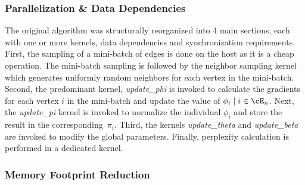 \subsubsection{Parallelization \& Data Dependencies}
The original algorithm was structurally reorganized into 4 main sections, each with
one or more kernels, data dependencies and synchronization requirements.
%
First, the sampling of a mini-batch of edges is done on the host as it is a
cheap operation. The mini-batch sampling is followed by the neighbor sampling
kernel which generates uniformly random neighbors for each vertex in the
mini-batch. 
%
Second, the predominant kernel, \textit{update\_phi} is invoked to calculate the
gradients for each vertex $i$ in the mini-batch \Minibatch and update the value of $\phi_i
\mid i \in \Minibatch$. Next, the \textit{update\_pi} kernel is invoked to normalize the
individual $\phi_i$ and store the result in the corresponding~$\pi_i$.
%
Third, the kernels \textit{update\_theta} and \textit{update\_beta} are invoked to modify the
global parameters.
%
Finally, perplexity calculation is performed in a dedicated kernel.

\subsubsection{Memory Footprint Reduction}

